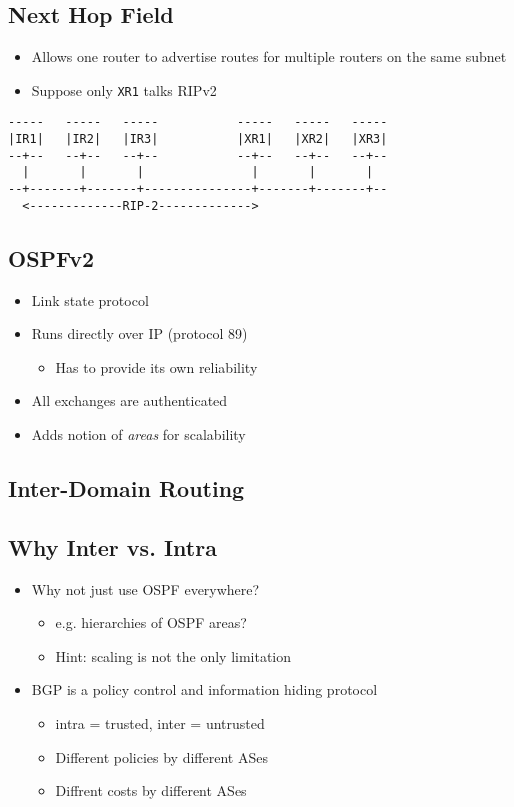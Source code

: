 \subsection{Next Hop Field}
\begin{itemize}[nosep]
    \item Allows one router to advertise routes for multiple routers on the same subnet
    \item Suppose only \texttt{XR1} talks RIPv2
\end{itemize}
\begin{verbatim}
-----   -----   -----           -----   -----   -----
|IR1|   |IR2|   |IR3|           |XR1|   |XR2|   |XR3|
--+--   --+--   --+--           --+--   --+--   --+--
  |       |       |               |       |       |
--+-------+-------+---------------+-------+-------+--
  <-------------RIP-2------------->
\end{verbatim}
\subsection{OSPFv2}
\begin{itemize}[nosep]
    \item Link state protocol
    \item Runs directly over IP (protocol 89)
          \begin{itemize}[nosep]
              \item Has to provide its own reliability
          \end{itemize}
    \item All exchanges are authenticated
    \item Adds notion of \emph{areas} for scalability
\end{itemize}
\subsection{Inter-Domain Routing}
\subsection{Why Inter vs. Intra}
\begin{itemize}[nosep]
    \item Why not just use OSPF everywhere?
          \begin{itemize}[nosep]
              \item e.g. hierarchies of OSPF areas?
              \item Hint: scaling is not the only limitation
          \end{itemize}
    \item BGP is a policy control and information hiding protocol
          \begin{itemize}[nosep]
              \item intra = trusted, inter = untrusted
              \item Different policies by different ASes
              \item Diffrent costs by different ASes
          \end{itemize}
\end{itemize}